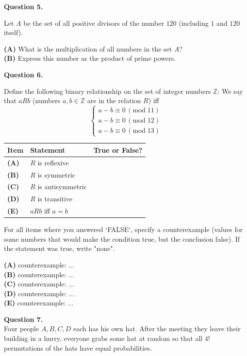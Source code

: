 \documentclass[jou]{apa6}
\begin{document}
\vspace{10pt}
{\bf Question 5.}

Let $A$ be the set of all positive divisors of the number $120$ 
(including $1$ and $120$ itself).  

{\bf (A)} What is the multiplication of all 
numbers in the set $A$?\\
{\bf (B)} Express this number as the product of prime powers.

 
 


\vspace{10pt}
{\bf Question 6.} 

Define the following binary relationship on the set of 
integer numbers $\mathbb{Z}$:   
We say that $aRb$ (numbers $a,b \in \mathbb{Z}$ are in the relation $R$) iff
$$\left\{ \begin{array}{l}
a - b \equiv 0\,(\text{mod}\;11)\\
a - b \equiv 0\,(\text{mod}\;12)\\
a - b \equiv 0\,(\text{mod}\;13)
\end{array} \right.$$

\begin{tabular}{|l|l|l|} \hline
{\bf Item} & {\bf Statement} & {\bf True or False?} \\ \hline
{\bf (A)} & $R$ is reflexive &  \\ \hline
{\bf (B)} & $R$ is symmetric &  \\ \hline
{\bf (C)} & $R$ is antisymmetric &  \\ \hline
{\bf (D)} & $R$ is transitive &  \\ \hline
{\bf (E)} & $aRb$ iff $a=b$ &  \\ \hline
\end{tabular}

For all items where you answered `FALSE`, specify a counterexample
(values for some numbers that would make the condition true, but the 
conclusion false). 
If the statement was true, write "none".


{\bf (A)} counterexample: $\ldots$\\
{\bf (B)} counterexample: $\ldots$\\
{\bf (C)} counterexample: $\ldots$\\
{\bf (D)} counterexample: $\ldots$\\
{\bf (E)} counterexample: $\ldots$


\vspace{10pt}
{\bf Question 7.}\\
Four people $A,B,C,D$ each has his own hat. 
After the meeting they leave their 
building in a hurry, everyone grabs some hat at random 
so that all $4!$ permutations of the hats have equal probabilities. 
\end{document}
